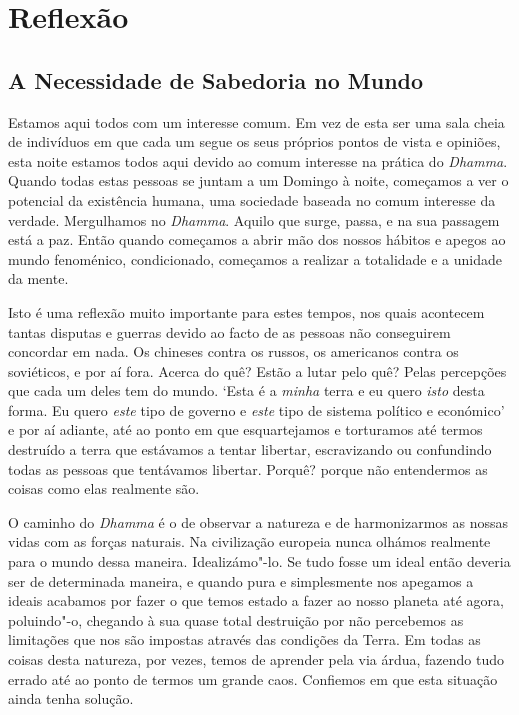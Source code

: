 \part{Reflexão}

\chapter{A Necessidade de Sabedoria no Mundo}

Estamos aqui todos com um interesse comum. Em vez de esta ser uma sala
cheia de indivíduos em que cada um segue os seus próprios pontos de
vista e opiniões, esta noite estamos todos aqui devido ao comum
interesse na prática do \emph{Dhamma}. Quando todas estas pessoas se
juntam a um Domingo à noite, começamos a ver o potencial da existência
humana, uma sociedade baseada no comum interesse da verdade. Mergulhamos
no \emph{Dhamma}. Aquilo que surge, passa, e na sua passagem está a paz.
Então quando começamos a abrir mão dos nossos hábitos e apegos ao mundo
fenoménico, condicionado, começamos a realizar a totalidade e a unidade
da mente.

Isto é uma reflexão muito importante para estes tempos, nos quais
acontecem tantas disputas e guerras devido ao facto de as pessoas não
conseguirem concordar em nada. Os chineses contra os russos, os
americanos contra os soviéticos, e por aí fora. Acerca do quê? Estão a
lutar pelo quê? Pelas percepções que cada um deles tem do mundo. `Esta é
a \emph{minha} terra e eu quero \emph{isto} desta forma. Eu quero
\emph{este} tipo de governo e \emph{este} tipo de sistema político e
económico' e por aí adiante, até ao ponto em que esquartejamos e
torturamos até termos destruído a terra que estávamos a tentar libertar,
escravizando ou confundindo todas as pessoas que tentávamos libertar.
Porquê? porque não entendermos as coisas como elas realmente são.

O caminho do \emph{Dhamma} é o de observar a natureza e de harmonizarmos
as nossas vidas com as forças naturais. Na civilização europeia nunca
olhámos realmente para o mundo dessa maneira. Idealizámo"-lo. Se tudo
fosse um ideal então deveria ser de determinada maneira, e quando pura e
simplesmente nos apegamos a ideais acabamos por fazer o que temos
estado a fazer ao nosso planeta até agora, poluindo"-o, chegando à sua
quase total destruição por não percebemos as limitações que nos são
impostas através das condições da Terra. Em todas as coisas desta
natureza, por vezes, temos de aprender pela via árdua, fazendo tudo
errado até ao ponto de termos um grande caos. Confiemos em que esta
situação ainda tenha solução.

